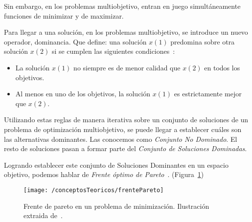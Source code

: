 Sin embargo, en los problemas multiobjetivo, entran en juego simultáneamente funciones de minimizar y de maximizar.

Para llegar a una solución, en los problemas multiobjetivo, se introduce un nuevo operador, dominancia. Que define: una solución 
$x(1)$ predomina sobre otra solución $x(2)$ si se cumplen las siguientes condiciones~\cite{pdf:nsga-ii}:

\begin{itemize}
	\item La solución $x(1)$ no siempre es de menor calidad que $x(2)$ en todos los objetivos.
	\item Al menos en uno de los objetivos, la solución $x(1)$ es estrictamente mejor que $x(2)$.
\end{itemize}

Utilizando estas reglas de manera iterativa sobre un conjunto de soluciones de un problema de optimización multiobjetivo, se puede llegar a establecer cuáles son las alternativas dominantes. Las conocemos como \textit{Conjunto No Dominado}.
El resto de soluciones pasan a formar parte del \textit{Conjunto de Soluciones Dominadas}. 

Logrando establecer este conjunto de Soluciones Dominantes en un espacio objetivo, podemos hablar de \textit{Frente óptimo de Pareto}~\cite{img:frente_pareto}. (Figura~\ref{fig:frentePareto})

\begin{figure}[ht]
	\centering
	\texttt{[image: /conceptosTeoricos/frentePareto]}
	\caption{Frente de pareto en un problema de minimización. Ilustración extraida de~\cite{img:frente_pareto}.}
	\label{fig:frentePareto}
\end{figure}
